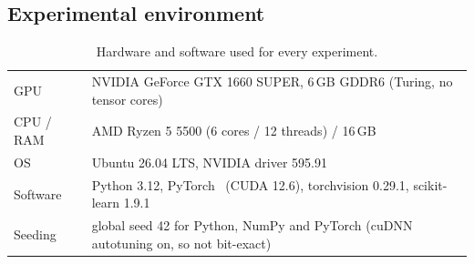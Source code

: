 \subsection{Experimental environment}
\begin{table}[H]
\centering
\caption{Hardware and software used for every experiment.}
\label{tab:env}
\small
\begin{tabularx}{\textwidth}{lX}
\toprule
GPU & NVIDIA GeForce GTX 1660 SUPER, 6\,GB GDDR6 (Turing, no tensor cores) \\
CPU / RAM & AMD Ryzen 5 5500 (6 cores / 12 threads) / 16\,GB \\
OS & Ubuntu 26.04 LTS, NVIDIA driver 595.91 \\
Software & Python 3.12, PyTorch~\cite{pytorch} \TorchVersion{} (CUDA 12.6), torchvision 0.29.1, scikit-learn 1.9.1 \\
Seeding & global seed 42 for Python, NumPy and PyTorch (cuDNN autotuning on, so not bit-exact) \\
\bottomrule
\end{tabularx}
\end{table}

